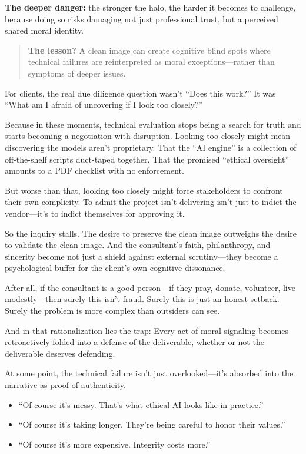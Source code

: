 \begin{tcolorbox}[colback=blue!5!white, colframe=blue!50!black, breakable,
    title={Psychological Sidebar: The Halo Effect — When Virtue in One Domain Shields Vice in Another}]
  \medskip
  
  \textbf{The deeper danger:} the stronger the halo, the harder it becomes to challenge, because doing so risks damaging not just professional trust, but a perceived shared moral identity.
  
  \medskip
  
  \begin{quote}
  \textbf{The lesson?} A clean image can create cognitive blind spots where technical failures are reinterpreted as moral exceptions—rather than symptoms of deeper issues.
  \end{quote}
  
\end{tcolorbox}
  

For clients, the real due diligence question wasn’t “Does this work?”  
It was “What am I afraid of uncovering if I look too closely?”

Because in these moments, technical evaluation stops being a search for truth and starts becoming a negotiation with disruption. Looking too closely might mean discovering the models aren’t proprietary. That the “AI engine” is a collection of off-the-shelf scripts duct-taped together. That the promised “ethical oversight” amounts to a PDF checklist with no enforcement.

But worse than that, looking too closely might force stakeholders to confront their own complicity.  
To admit the project isn’t delivering isn’t just to indict the vendor—it’s to indict themselves for approving it.

So the inquiry stalls. The desire to preserve the clean image outweighs the desire to validate the clean image. And the consultant’s faith, philanthropy, and sincerity become not just a shield against external scrutiny—they become a psychological buffer for the client’s own cognitive dissonance.

After all, if the consultant is a good person—if they pray, donate, volunteer, live modestly—then surely this isn’t fraud. Surely this is just an honest setback. Surely the problem is more complex than outsiders can see.

And in that rationalization lies the trap:  
Every act of moral signaling becomes retroactively folded into a defense of the deliverable, whether or not the deliverable deserves defending.

At some point, the technical failure isn’t just overlooked—it’s absorbed into the narrative as proof of authenticity.  
\begin{itemize}
    \item “Of course it’s messy. That’s what ethical AI looks like in practice.”  
    \item “Of course it’s taking longer. They’re being careful to honor their values.”  
    \item “Of course it’s more expensive. Integrity costs more.”
\end{itemize}

